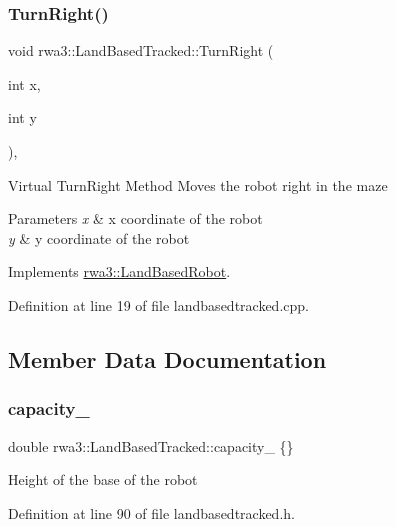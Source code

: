 \subsubsection{\texorpdfstring{Turn\+Right()}{TurnRight()}}
{\footnotesize\ttfamily void rwa3\+::\+Land\+Based\+Tracked\+::\+Turn\+Right (\begin{DoxyParamCaption}\item[{int}]{x,  }\item[{int}]{y }\end{DoxyParamCaption})\hspace{0.3cm}{\ttfamily [override]}, {\ttfamily [virtual]}}

Virtual Turn\+Right Method Moves the robot right in the maze 
\begin{DoxyParams}{Parameters}
{\em x} & x coordinate of the robot \\
\hline
{\em y} & y coordinate of the robot \\
\hline
\end{DoxyParams}


Implements \hyperlink{classrwa3_1_1_land_based_robot_ab62f4e787ae7f04dd9374b4f7e84985c}{rwa3\+::\+Land\+Based\+Robot}.



Definition at line 19 of file landbasedtracked.\+cpp.



\subsection{Member Data Documentation}
\mbox{\label{classrwa3_1_1_land_based_tracked_a5b9e38961ec5d2850b9bd069e897f3cd}} 
\subsubsection{\texorpdfstring{capacity\+\_\+}{capacity\_}}
{\footnotesize\ttfamily double rwa3\+::\+Land\+Based\+Tracked\+::capacity\+\_\+ \{\}\hspace{0.3cm}{\ttfamily [protected]}}

Height of the base of the robot 

Definition at line 90 of file landbasedtracked.\+h.

\mbox{\label{classrwa3_1_1_land_based_tracked_a5e829ff7fae33fb1c29f5897c09311c8}} 
